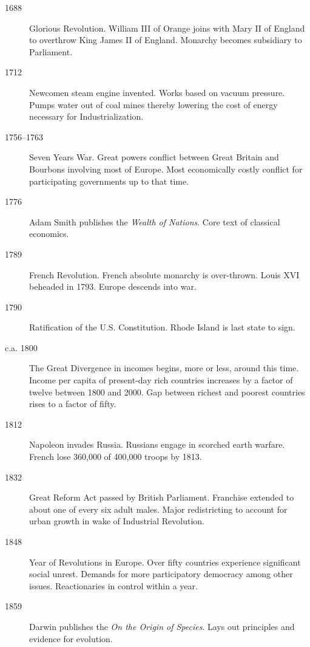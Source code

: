 \documentclass[11pt]{article}
\begin{document}
\begin{description}
\item[1688]  Glorious Revolution.  William III of Orange joins with Mary II of England to overthrow King James II of England.  Monarchy becomes subsidiary to Parliament.

\item[1712]  Newcomen steam engine invented.  Works based on vacuum pressure.  Pumps water out of coal mines thereby lowering the cost of energy necessary for Industrialization.

\item[1756--1763]  Seven Years War.  Great powers conflict between Great Britain and Bourbons involving most of Europe.  Most economically costly conflict for participating governments up to that time.

\item[1776]  Adam Smith publishes the \textit{Wealth of Nations}.  Core text of classical economics.

\item[1789] French Revolution.  French absolute monarchy is over-thrown.  Louis XVI beheaded in 1793.  Europe descends into war.

\item[1790]  Ratification of the U.S. Constitution.  Rhode Island is last state to sign.

\item[c.a. 1800]  The Great Divergence in incomes begins, more or less, around this time.  Income per capita of present-day rich countries increases by a factor of twelve between 1800 and 2000.  Gap between richest and poorest countries rises to a factor of fifty.

\item[1812]  Napoleon invades Russia.  Russians engage in scorched earth warfare.  French lose 360,000 of 400,000 troops by 1813.

\item[1832]  Great Reform Act passed by British Parliament.  Franchise extended to about one of every six adult males.  Major redistricting to account for urban growth in wake of Industrial Revolution.    

\item[1848]  Year of Revolutions in Europe.  Over fifty countries experience significant social unrest.  Demands for more participatory democracy among other issues.  Reactionaries in control within a year.

\item[1859]  Darwin publishes the \textit{On the Origin of Species}.  Lays out principles and evidence for evolution.


\end{description}
\end{document}

